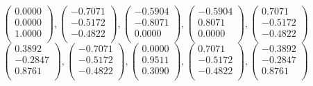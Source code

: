 \begin{equation*}
\begin{pmatrix}
0.0000\\
0.0000\\
1.0000\\
\end{pmatrix}
,
\begin{pmatrix}
-0.7071\\
-0.5172\\
-0.4822\\
\end{pmatrix}
,
\begin{pmatrix}
-0.5904\\
-0.8071\\
0.0000\\
\end{pmatrix}
,
\begin{pmatrix}
-0.5904\\
0.8071\\
0.0000\\
\end{pmatrix}
,
\begin{pmatrix}
0.7071\\
-0.5172\\
-0.4822\\
\end{pmatrix}
\end{equation*}
\begin{equation*}
\begin{pmatrix}
0.3892\\
-0.2847\\
0.8761\\
\end{pmatrix}
,
\begin{pmatrix}
-0.7071\\
-0.5172\\
-0.4822\\
\end{pmatrix}
,
\begin{pmatrix}
0.0000\\
0.9511\\
0.3090\\
\end{pmatrix}
,
\begin{pmatrix}
0.7071\\
-0.5172\\
-0.4822\\
\end{pmatrix}
,
\begin{pmatrix}
-0.3892\\
-0.2847\\
0.8761\\
\end{pmatrix}
\end{equation*}
